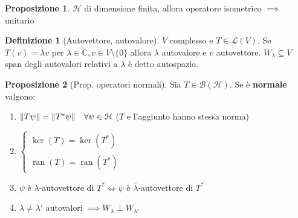 \documentclass[a4paper,10pt]{article}
\theoremstyle{definition}
\DeclareMathOperator*{\ran}{ran}
\newcommand{\im}{\mathbb{C}} %
\newcommand{\hil}{\mathcal{H}} %
\theoremstyle{indentdefinition}
\newtheorem{defn}{Definizione}[section]
\theoremstyle{indenttheorem}
\newtheorem{prop}{Proposizione}
\theoremstyle{myremark}
\theoremstyle{indentgeneral}
\newenvironment{myboxed} 
{\noindent\begin{lrbox}{\mybox}\begin{minipage}{\textwidth}}
{\end{minipage}\end{lrbox}\fbox{\usebox{\mybox}}}
\begin{document}
\begin{prop}
    $\hil$ di dimensione finita, allora operatore isometrico $\implies$ unitario
\end{prop}

\begin{defn}[Autovettore, autovalore]
    $V$ complesso e $T\in\mathcal{L}(V)$. Se $T(v)=\lambda v$ per $\lambda\in \im,v\in V\setminus\{0\}$ allora $\lambda$ autovalore e $v$ autovettore. $W_\lambda\subseteq V$ span degli autovalori relativi a $\lambda$ è detto autospazio.
\end{defn}

\begin{myboxed}
\begin{prop}[Prop. operatori normali]\label{thm-prop-operatori-normali}
    Sia $T\in\mathcal{B}(\hil)$. Se è \textbf{normale} valgono:
    \begin{enumerate}
        \item $\norm{T\psi}=\norm{T^*\psi}\quad \forall\psi\in\hil$ ($T$ e l'aggiunto hanno stessa norma)
        \item $\begin{cases}
            \ker(T)=\ker(T^*)\\
            \overline{\ran(T)}=\overline{\ran(T^*)}
        \end{cases}$
        \item $\psi$ è $\lambda$-autovettore di $T^*\iff\psi$ è $\overline{\lambda}$-autovettore di $T^*$
        \item $\lambda\ne\lambda'$ autovalori $\implies W_\lambda\perp W_{\lambda'}$
    \end{enumerate}
\end{prop}
\end{myboxed}
\end{document}
